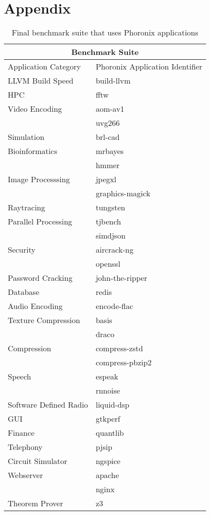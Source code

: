 \section{Appendix} \label{sec:appendix}

\begin{table}
\centering
\begin{tabular}{ |p{5cm}|p{5cm}|  }
 \hline
 \multicolumn{2}{|c|}{Benchmark Suite} \\
 \hline
 Application Category & Phoronix Application Identifier\\
 \hline
 LLVM Build Speed   & build-llvm    \\
 \hline
 HPC & fftw    \\
 \hline
 Video Encoding & aom-av1    \\
 & uvg266    \\
 \hline
 Simulation & brl-cad \\
 \hline
 Bioinformatics & mrbayes \\
 & hmmer \\
 \hline
 Image Processsing & jpegxl \\
 & graphics-magick \\
 \hline
 Raytracing & tungsten \\
 \hline
 Parallel Processing & tjbench \\
 & simdjson \\
 \hline
 Security & aircrack-ng \\
 & openssl \\
 \hline
 Password Cracking & john-the-ripper \\
 \hline
 Database & redis \\
 \hline
 Audio Encoding & encode-flac \\
 \hline
 Texture Compression & basis \\
 & draco \\
 \hline
 Compression & compress-zstd \\
 & compress-pbzip2 \\
 \hline
 Speech & espeak \\
 & rnnoise \\
 \hline
 Software Defined Radio & liquid-dsp \\
 \hline
 GUI & gtkperf \\
 \hline
 Finance & quantlib \\
 \hline
 Telephony & pjsip \\
 \hline
 Circuit Simulator & ngspice \\
 \hline
 Webserver & apache \\
 & nginx \\
 \hline
 Theorem Prover & z3 \\
 \hline
\end{tabular}
\caption{\label{tab:suite} Final benchmark suite that uses Phoronix applications}
\end{table}
